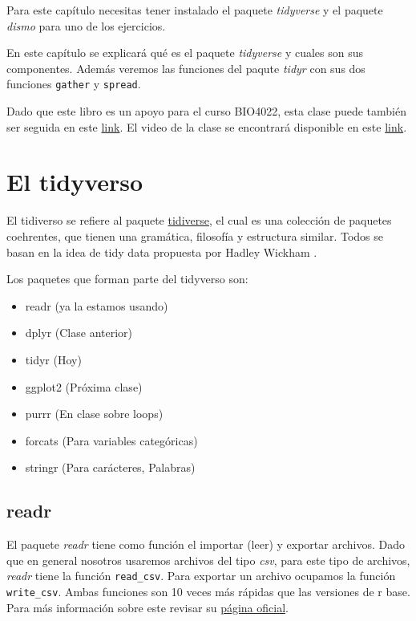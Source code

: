 \documentclass[]{book}
\providecommand{\tightlist}{%
  \setlength{\itemsep}{0pt}\setlength{\parskip}{0pt}}
\begin{document}
Para este capítulo necesitas tener instalado el paquete \emph{tidyverse}
y el paquete \emph{dismo} para uno de los ejercicios.

En este capítulo se explicará qué es el paquete \emph{tidyverse}
\citep{Wickhamtidyverse} y cuales son sus componentes. Además veremos
las funciones del paqute \emph{tidyr} \citep{Wickhamtidy} con sus dos
funciones \texttt{gather} y \texttt{spread}.

Dado que este libro es un apoyo para el curso BIO4022, esta clase puede
también ser seguida en este
\href{https://derek-corcoran-barrios.github.io/Clase3/Clase3Hadleyverso}{link}.
El video de la clase se encontrará disponible en este
\href{https://www.youtube.com/watch?v=UhmHsx5X9Ug\&feature=youtu.be}{link}.

\hypertarget{el-tidyverso}{%
\section{El tidyverso}\label{el-tidyverso}}

El tidiverso se refiere al paquete
\href{https://www.tidyverse.org/}{tidiverse}, el cual es una colección
de paquetes coehrentes, que tienen una gramática, filosofía y estructura
similar. Todos se basan en la idea de tidy data propuesta por Hadley
Wickham \citep{wickham2014tidy}.

Los paquetes que forman parte del tidyverso son:

\begin{itemize}
\tightlist
\item
  readr (ya la estamos usando)
\item
  dplyr (Clase anterior)
\item
  tidyr (Hoy)
\item
  ggplot2 (Próxima clase)
\item
  purrr (En clase sobre loops)
\item
  forcats (Para variables categóricas)
\item
  stringr (Para carácteres, Palabras)
\end{itemize}

\hypertarget{readr}{%
\subsection{readr}\label{readr}}

El paquete \emph{readr} \citep{Wickhamreadr} tiene como función el
importar (leer) y exportar archivos. Dado que en general nosotros
usaremos archivos del tipo \emph{csv}, para este tipo de archivos,
\emph{readr} tiene la función \texttt{read\_csv}. Para exportar un
archivo ocupamos la función \texttt{write\_csv}. Ambas funciones son 10
veces más rápidas que las versiones de r base. Para más información
sobre este revisar su \href{https://readr.tidyverse.org/}{página
oficial}.
\end{document}
